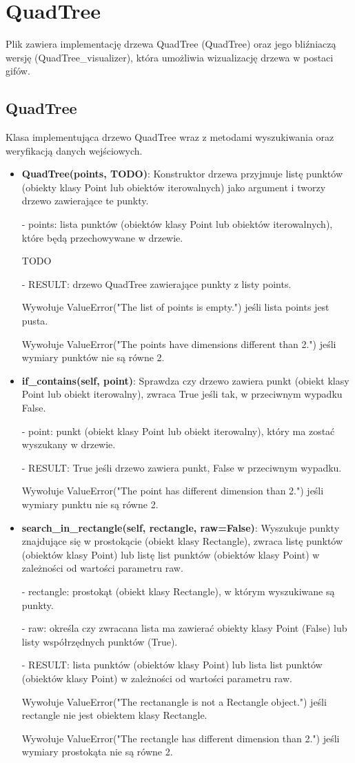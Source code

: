 \documentclass{lab}
\begin{document}
\section{QuadTree}
Plik zawiera implementację drzewa QuadTree (QuadTree) oraz jego bliźniaczą wersję (QuadTree\_visualizer), która umożliwia wizualizację drzewa w postaci gifów.
\subsection{QuadTree}
Klasa implementująca drzewo QuadTree wraz z metodami wyszukiwania oraz weryfikacją danych wejściowych.
\begin{itemize}
  \item \textbf{QuadTree(points, TODO)}:
  Konstruktor drzewa przyjmuje listę punktów (obiekty klasy Point lub obiektów iterowalnych) jako argument i tworzy drzewo zawierające te punkty.

  - points: lista punktów (obiektów klasy Point lub obiektów iterowalnych), które będą przechowywane w drzewie.

  TODO

  - RESULT: drzewo QuadTree zawierające punkty z listy points.

  Wywołuje ValueError("The list of points is empty.") jeśli lista points jest pusta.

  Wywołuje ValueError("The points have dimensions different than 2.") jeśli wymiary punktów nie są równe 2.

  \item \textbf{if\_contains(self, point)}:
  Sprawdza czy drzewo zawiera punkt (obiekt klasy Point lub obiekt iterowalny), zwraca True jeśli tak, w przeciwnym wypadku False.

  - point: punkt (obiekt klasy Point lub obiekt iterowalny), który ma zostać wyszukany w drzewie.

  - RESULT: True jeśli drzewo zawiera punkt, False w przeciwnym wypadku.

  Wywołuje ValueError("The point has different dimension than 2.") jeśli wymiary punktu nie są równe 2.

  \item \textbf{search\_in\_rectangle(self, rectangle, raw=False)}:
  Wyszukuje punkty znajdujące się w prostokącie (obiekt klasy Rectangle), zwraca listę punktów (obiektów klasy Point) lub listę list punktów (obiektów klasy Point) w zależności od wartości parametru raw.

  - rectangle: prostokąt (obiekt klasy Rectangle), w którym wyszukiwane są punkty.

  - raw: określa czy zwracana lista ma zawierać obiekty klasy Point (False) lub listy współrzędnych punktów (True).

  - RESULT: lista punktów (obiektów klasy Point) lub lista list punktów (obiektów klasy Point) w zależności od wartości parametru raw.

  Wywołuje ValueError("The rectanangle is not a Rectangle object.") jeśli rectangle nie jest obiektem klasy Rectangle.

  Wywołuje ValueError("The rectangle has different dimension than 2.") jeśli wymiary prostokąta nie są równe 2.
\end{itemize}
\end{document}
